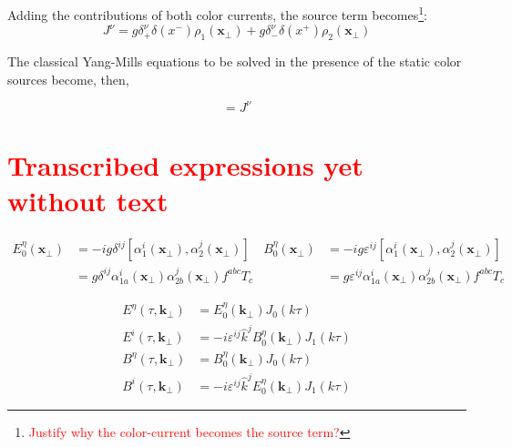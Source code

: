 Adding the contributions of both color currents, the source term becomes\textcolor{red}{\footnote{\textcolor{red}{Justify why the color-current becomes the source term?}}}:
\begin{equation}
	J^\nu = g \delta^\nu_+ \delta (x^-) \rho_1 (\mathbf{x}_\perp) + g \delta^\nu_- \delta (x^+) \rho_2 (\mathbf{x}_\perp)
\end{equation}

The classical Yang-Mills equations to be solved in the presence of the static color sources become, then,

\begin{equation}
	[D_\mu, F^{\mu \nu}] = J^\nu
\end{equation}

\section{\textcolor{red}{Transcribed expressions yet without text}}

\begin{subequations} \label{eq:initial_fields}
	\begin{equation}
		\begin{split}
			E^\eta_0(\mathbf{x}_\perp) & = -ig \delta^{ij} [\alpha^i_1 (\mathbf{x}_\perp), \alpha^j_2(\mathbf{x}_\perp)] \\
			& = g \delta^{ij}   \alpha^i_{1a} (\mathbf{x}_\perp) \alpha^j_{2b}(\mathbf{x}_\perp)f^{abc} T_c
		\end{split} \label{eq:initial_E}
	\end{equation}
	\begin{equation}
		\begin{split}
			B^\eta_0(\mathbf{x}_\perp) & = -ig \varepsilon^{ij} [\alpha^i_1 (\mathbf{x}_\perp), \alpha^j_2(\mathbf{x}_\perp)] \\
			& = g \varepsilon^{ij} \alpha^i_{1a} (\mathbf{x}_\perp) \alpha^j_{2b}(\mathbf{x}_\perp) f^{abc} T_c
		\end{split} \label{eq:initial_B}
	\end{equation}
\end{subequations}

\begin{subequations} \label{eq:EB_from_initial_EB}
	\begin{align}
		E^\eta(\tau,\mathbf{k}_\perp) & = E^\eta_0 (\mathbf{k}_\perp) J_0 (k \tau) \\
		E^i(\tau,\mathbf{k}_\perp) & = -i \varepsilon^{ij} \hat{k}^j B_0^\eta (\mathbf{k}_\perp) J_1 (k \tau) \\
		B^\eta(\tau,\mathbf{k}_\perp) & = B^\eta_0 (\mathbf{k}_\perp) J_0 (k \tau) \\
		B^i(\tau,\mathbf{k}_\perp) & = -i \varepsilon^{ij} \hat{k}^j E_0^\eta (\mathbf{k}_\perp) J_1 (k \tau)
	\end{align}
\end{subequations}

